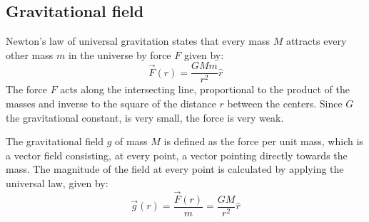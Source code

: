 \documentclass[\main/master.tex]{subfiles}
\begin{document}
\subsection{Gravitational field}
Newton's law of universal gravitation states that every mass $M$ attracts every other mass $m$ in the universe by force $F$ given by:
\begin{equation}
\overrightarrow{F}(r) = \frac{GMm}{r^2}\hat{r}    \label{eqn:gravitation_force}
\end{equation}
The force $F$ acts along the intersecting line, proportional to the product of the masses and inverse to the square of the distance $r$ between the centers. Since $G$ the gravitational constant, is very small, the force is very weak.
\par\noindent
The gravitational field $g$ of mass $M$ is defined as the force per unit mass, which is a vector field consisting, at every point, a vector pointing directly towards the mass. The magnitude of the field at every point is calculated by applying the universal law, given by: 
\begin{equation}
\overrightarrow{g}(r) = \frac{\overrightarrow{F}(r)}{m} = \frac{GM}{r^2}\hat{r}    \label{eqn:gravitation_field}
\end{equation}
\iffalse
\subsubsection{Field measurement}
\par\noindent
The field caused by a test mass $M$ at a specific point is calculated by measuring the gravitational force acting on a known mass $m$. In general, test mass $M$ is much larger than mass $m$, ensuring a negligible influence on the behaviour of $M$.  
\fi
\end{document}
